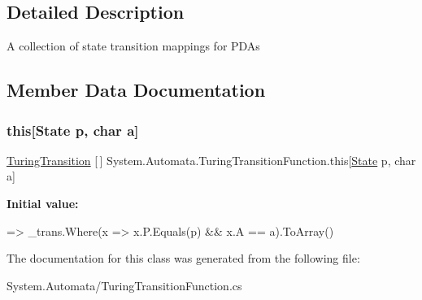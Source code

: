 \subsection{Detailed Description}
A collection of state transition mappings for P\+D\+As 



\subsection{Member Data Documentation}
\mbox{\label{class_system_1_1_automata_1_1_turing_transition_function_a1f3d2faa8ea2a3b623c2e7cb55c56290}} 
\subsubsection{\texorpdfstring{this[State p, char a]}{this[State p, char a]}}
{\footnotesize\ttfamily \mbox{\hyperlink{class_system_1_1_automata_1_1_turing_transition}{Turing\+Transition}} \mbox{[}$\,$\mbox{]} System.\+Automata.\+Turing\+Transition\+Function.\+this\mbox{[}\mbox{\hyperlink{class_system_1_1_automata_1_1_state}{State}} p, char a\mbox{]}}

{\bfseries Initial value\+:}
\begin{DoxyCode}
=>
            \_trans.Where(x => x.P.Equals(p) && x.A == a).ToArray()
\end{DoxyCode}


The documentation for this class was generated from the following file\+:\begin{DoxyCompactItemize}
\item 
System.\+Automata/Turing\+Transition\+Function.\+cs\end{DoxyCompactItemize}
